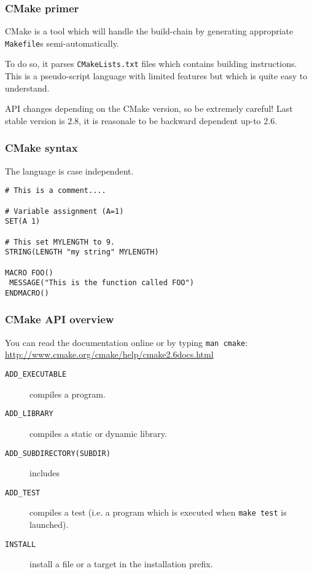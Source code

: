 \documentclass[hyperref={pdfpagelabels=false}]{beamer}
\begin{document}
\begin{frame}[fragile]
\frametitle{CMake primer}

CMake is a tool which will handle the build-chain by generating
appropriate \texttt{Makefile}s semi-automatically.

\vspace{0.3cm}

To do so, it parses \texttt{CMakeLists.txt} files which contains
building instructions. This is a pseudo-script language with limited
features but which is quite easy to understand.

\vspace{0.3cm}

API changes depending on the CMake version, so be extremely careful!
Last stable version is 2.8, it is reasonale to be backward dependent
up-to 2.6.

\end{frame}


\begin{frame}[fragile]
\frametitle{CMake syntax}

The language is case independent.

\begin{verbatim}
# This is a comment....

# Variable assignment (A=1)
SET(A 1)

# This set MYLENGTH to 9.
STRING(LENGTH "my string" MYLENGTH)

MACRO FOO()
 MESSAGE("This is the function called FOO")
ENDMACRO()
\end{verbatim}
\end{frame}

\begin{frame}[fragile]
\frametitle{CMake API overview}

You can read the documentation online or by typing \texttt{man cmake}:
\url{http://www.cmake.org/cmake/help/cmake2.6docs.html}

\begin{description}
\item[\texttt{ADD\_EXECUTABLE}] compiles a program.
\item[\texttt{ADD\_LIBRARY}] compiles a static or dynamic library.
\item[\texttt{ADD\_SUBDIRECTORY(SUBDIR)}] includes
\item[\texttt{ADD\_TEST}] compiles a test (i.e. a program which is
  executed when \texttt{make test} is launched).
\item[\texttt{INSTALL}] install a file or a target in the installation
  prefix.
\end{description}
\end{frame}
\end{document}
